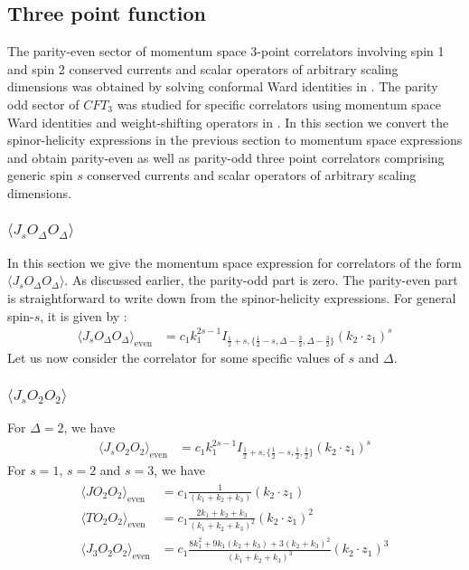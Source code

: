 \documentclass[a4paper,11pt]{article}
\begin{document}
\subsection{Three point function}
 The parity-even sector of momentum space 3-point correlators involving spin 1 and spin 2 conserved currents and scalar operators of arbitrary scaling dimensions was obtained by solving conformal Ward identities in  \cite{Bzowski:2013sza,Bzowski:2015pba,Bzowski:2017poo,Bzowski:2018fql}. The parity odd sector of $CFT_3$ was studied for specific correlators using momentum space Ward identities and weight-shifting operators in \cite{Jain:2021qcl}. In this section we convert the spinor-helicity expressions in the previous section to momentum space expressions and obtain parity-even as well as parity-odd three point correlators comprising generic spin $s$ conserved currents and scalar operators of arbitrary scaling dimensions. 
\subsubsection{$\langle J_s O_{\Delta} O_{\Delta} \rangle$}
In this section we give the momentum space expression for correlators of the form $\langle J_s O_{\Delta}O_{\Delta} \rangle$. As discussed earlier, the parity-odd part is zero. The parity-even part is straightforward to write down from the spinor-helicity expressions. For general spin-$s$, it is given by :
\begin{align}
    \langle J_s O_{\Delta} O_{\Delta} \rangle_{\text{even}} &= c_1 k_1^{2s-1}I_{\frac{1}{2}+s,\{\frac{1}{2}-s,\Delta-\frac{3}{2},\Delta-\frac{3}{2}\}}(k_2 \cdot z_1)^s
\end{align}
Let us now consider the correlator for some specific values of $s$ and $\Delta$.
\subsubsection*{$\langle J_s O_2 O_2 \rangle$}
For $\Delta=2$, we have
\begin{align}
    \langle J_s O_2 O_2 \rangle_{\text{even}} &= c_1 k_1^{2s-1}I_{\frac{1}{2}+s,\{\frac{1}{2}-s,\frac{1}{2},\frac{1}{2}\}}(k_2 \cdot z_1)^s
\end{align}
For $s=1$, $s=2$ and $s=3$, we have
\begin{align}\label{jso2o2momentum}
    \begin{split}
        \langle J O_2 O_2 \rangle_{\text{even}} &= c_1\frac{1}{(k_1+k_2+k_3)}(k_2 \cdot z_1)\\[5 pt]
        \langle T O_2 O_2 \rangle_{\text{even}} &= c_1\frac{2k_1+k_2+k_3}{(k_1+k_2+k_3)^2}(k_2 \cdot z_1)^2\\[5 pt]
        \langle J_3 O_2 O_2 \rangle_{\text{even}} &= c_1\frac{8k_1^2+9k_1(k_2+k_3)+3(k_2+k_3)^2}{(k_1+k_2+k_3)^3}(k_2 \cdot z_1)^3
    \end{split}
\end{align}
\end{document}
